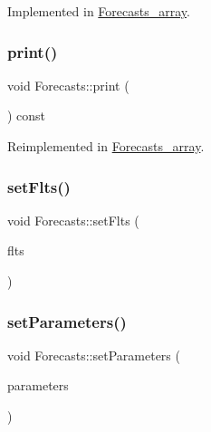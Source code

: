 Implemented in \mbox{\hyperlink{class_forecasts__array_a38f7b890af0947e0d2022ce5bc5bb514}{Forecasts\+\_\+array}}.

\mbox{\label{class_forecasts_addb1f75f0dc6833c466453c51256812c}} 
\subsubsection{\texorpdfstring{print()}{print()}}
{\footnotesize\ttfamily void Forecasts\+::print (\begin{DoxyParamCaption}\item[{std\+::ostream \&}]{ }\end{DoxyParamCaption}) const\hspace{0.3cm}{\ttfamily [virtual]}}



Reimplemented in \mbox{\hyperlink{class_forecasts__array_a56985347f516340034b29dc4cdda87b1}{Forecasts\+\_\+array}}.

\mbox{\label{class_forecasts_aa15a4e56c5747afc1594131ad30e4fc3}} 
\subsubsection{\texorpdfstring{set\+Flts()}{setFlts()}}
{\footnotesize\ttfamily void Forecasts\+::set\+Flts (\begin{DoxyParamCaption}\item[{\mbox{\hyperlink{classanen_time_1_1_f_l_ts}{anen\+Time\+::\+F\+L\+Ts}}}]{flts }\end{DoxyParamCaption})}

\mbox{\label{class_forecasts_a8dd1f257833a71c72deb3e8d595d607e}} 
\subsubsection{\texorpdfstring{set\+Parameters()}{setParameters()}}
{\footnotesize\ttfamily void Forecasts\+::set\+Parameters (\begin{DoxyParamCaption}\item[{\mbox{\hyperlink{classanen_par_1_1_parameters}{anen\+Par\+::\+Parameters}}}]{parameters }\end{DoxyParamCaption})}

